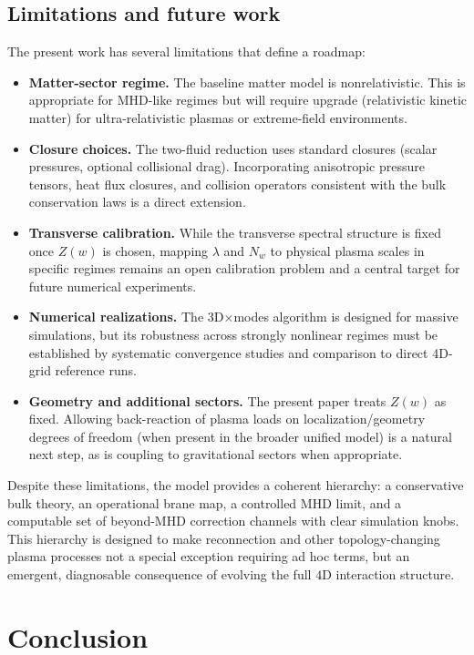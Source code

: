 \documentclass[11pt]{article}
\newcommand{\Z}{Z}              %
\begin{document}
\subsection{Limitations and future work}
The present work has several limitations that define a roadmap:
\begin{itemize}[leftmargin=1.7em]
\item \textbf{Matter-sector regime.} The baseline matter model is nonrelativistic. This is
appropriate for MHD-like regimes but will require upgrade (relativistic kinetic matter) for
ultra-relativistic plasmas or extreme-field environments.
\item \textbf{Closure choices.} The two-fluid reduction uses standard closures (scalar pressures,
optional collisional drag). Incorporating anisotropic pressure tensors, heat flux closures, and
collision operators consistent with the bulk conservation laws is a direct extension.
\item \textbf{Transverse calibration.} While the transverse spectral structure is fixed once \(\Z(w)\)
is chosen, mapping \(\lambda\) and \(N_w\) to physical plasma scales in specific regimes remains an
open calibration problem and a central target for future numerical experiments.
\item \textbf{Numerical realizations.} The 3D\(\times\)modes algorithm is designed for massive
simulations, but its robustness across strongly nonlinear regimes must be established by systematic
convergence studies and comparison to direct 4D-grid reference runs.
\item \textbf{Geometry and additional sectors.} The present paper treats \(\Z(w)\) as fixed.
Allowing back-reaction of plasma loads on localization/geometry degrees of freedom (when present in
the broader unified model) is a natural next step, as is coupling to gravitational sectors when
appropriate.
\end{itemize}

Despite these limitations, the model provides a coherent hierarchy: a conservative bulk theory,
an operational brane map, a controlled MHD limit, and a computable set of beyond-MHD correction
channels with clear simulation knobs. This hierarchy is designed to make reconnection and other
topology-changing plasma processes not a special exception requiring ad hoc terms, but an emergent,
diagnosable consequence of evolving the full \(4\)D interaction structure.

\section{Conclusion}
\label{sec:conclusion}
\end{document}
